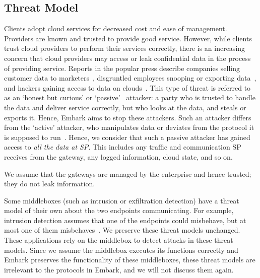 \documentclass[letterpaper,twocolumn,10pt]{article}
\newcommand{\sys}{Embark\xspace} %
\providecommand{\DIFdelend}{} %
\begin{document}

\DIFdelend \subsection{Threat Model}
  Clients adopt cloud services for decreased cost and ease of management. Providers are known and trusted to provide good service. 
  However, while clients trust cloud providers to perform their services correctly, there is an increasing concern that cloud providers may access or leak confidential data in the process of providing service.
  Reports in the popular press describe companies selling customer data to marketers~\cite{radioshack}, disgruntled employees snooping or exporting data~\cite{att}, and hackers gaining access to data on clouds~\cite{databreach,PrivacyRecords}.
  This type of threat is referred to as an `honest but curious' or `passive'~\cite{goodrich} attacker: a party who is trusted to handle the data and deliver service correctly, but who looks at the data, and steals or exports it.  Hence, \sys aims to stop these attackers.
  Such an attacker differs from the `active' attacker, who manipulates data or deviates from the protocol it is supposed to run~\cite{goodrich}.
%
Hence, we consider that such a passive attacker has gained access 
to {\em all the data at SP}.
This includes any traffic and communication SP receives from the 
gateway, any logged information, cloud state, and so on.  

We assume that the gateways are managed by the enterprise and hence trusted; they do not leak information.


Some middleboxes (such as intrusion or exfiltration detection) have a threat model
of their own about the two endpoints communicating. For example, intrusion detection assumes that 
one of the endpoints could misbehave, but at most one of them misbehaves~\cite{Bro}.  
We preserve these threat models unchanged. These applications rely
on the middlebox to detect attacks in these threat models. Since we assume the middlebox executes
its functions correctly and \sys preserves the functionality of these middleboxes, 
these threat models are irrelevant to the protocols in \sys, and we will not discuss them again. 
\end{document}
